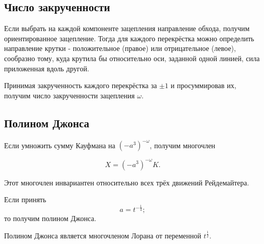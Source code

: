 \subsection{Число закрученности}

Если выбрать на каждой компоненте зацепления направление обхода, получим ориентированное зацепление. Тогда для каждого перекрёстка можно определить направление крутки - положительное (правое) или отрицательное (левое), сообразно тому, куда крутила бы относительно оси, заданной одной линией, сила приложенная вдоль другой.

Принимая закрученность каждого перекрёстка за $\pm 1$ и просуммировав их, получим число закрученности зацепления $\omega$.

\subsection{Полином Джонса}

Если умножить сумму Кауфмана на $(-a^3)^{-\omega}$, получим многочлен

$$X = (-a^3)^{-\omega}K.$$

Этот многочлен инвариантен относительно всех трёх движений Рейдемайтера.

Если принять
$$a = t^{-\frac{1}{4}};$$
то получим полином Джонса.

Полином Джонса является многочленом Лорана от переменной $t^{\frac{1}{2}}$.